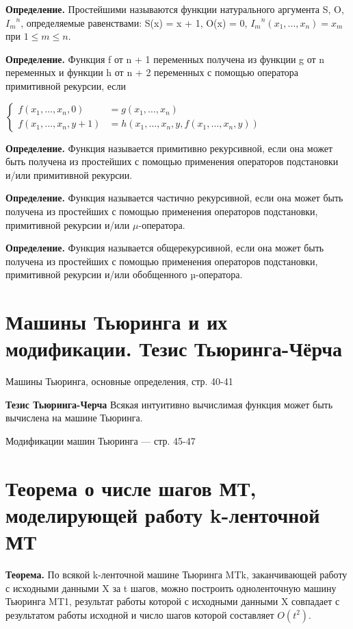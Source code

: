 \documentclass[40pt]{article}
\begin{document}
\textbf{Определение.} Простейшими называются функции натурального аргумента S, O, ${I_m}^n$, определяемые равенствами: S(x) = x + 1,
O(x) = 0, ${I_m}^n(x_1, . . . , x_n) = x_m$ при $1 \leq m \leq n$.

\textbf{Определение.} Функция f от n + 1 переменных получена из
функции g от n переменных и функции h от n + 2 переменных с
помощью оператора примитивной рекурсии, если 

$\left\{\begin{aligned}
f\left(x_{1}, \ldots, x_{n}, 0\right) &=g\left(x_{1}, \ldots, x_{n}\right) \\
f\left(x_{1}, \ldots, x_{n}, y+1\right) &=h\left(x_{1}, \ldots, x_{n}, y, f\left(x_{1}, \ldots, x_{n}, y\right)\right)
\end{aligned}\right.$

\textbf{Определение.} Функция называется примитивно рекурсивной, если она может быть получена из простейших с помощью
применения операторов подстановки и/или примитивной рекурсии.

\textbf{Определение.} Функция называется частично рекурсивной,
если она может быть получена из простейших с помощью применения операторов подстановки, примитивной рекурсии и/или $\mu$-оператора.

\textbf{Определение.} Функция называется общерекурсивной, если
она может быть получена из простейших с помощью применения
операторов подстановки, примитивной рекурсии и/или обобщенного µ-оператора.

\section{Машины Тьюринга и их модификации. Тезис Тьюринга-Чёрча}

Машины Тьюринга, основные определения, стр. 40-41

\textbf{Тезис Тьюринга-Черча} Всякая интуитивно вычислимая функция может быть вычислена на машине Тьюринга.

Модификации машин Тьюринга --- стр. 45-47

\section{Теорема о числе шагов МТ, моделирующей работу k-ленточной МТ}

\textbf{Теорема.} По всякой k-ленточной машине Тьюринга MTk,
заканчивающей работу с исходными данными X за t шагов, можно
построить одноленточную машину Тьюринга MT1, результат работы которой с исходными данными X совпадает с результатом
работы исходной и число шагов которой составляет $O(t^2)$.
\end{document}
